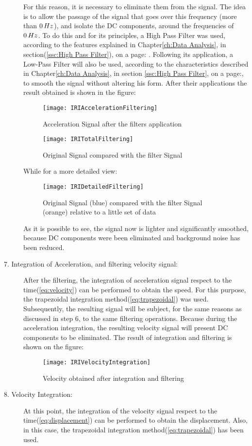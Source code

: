 \documentclass[tesi]{subfiles}
\begin{document}
\begin{description}
For this reason, it is necessary to eliminate them from the signal. The idea is to allow the passage of the signal that goes over this frequency (more than $0 \thinspace Hz$), and isolate the DC components, around the frequencies of $0 \thinspace Hz$. To do this and for its principles, a High Pass Filter was used, according to the features explained in Chapter\ref{ch:Data Analysis}, in section(\ref{ssc:High Pass Filter}), on a page: \pageref{ssc:High Pass Filter}.
Following its application, a Low-Pass Filter will also be used, according to the characteristics described in Chapter\ref{ch:Data Analysis}, in section \ref{ssc:High Pass Filter}, on a page:\pageref{ssc:Low Pass Filter}, to smooth the signal without altering his form.
After their applications the result obtained is shown in the figure:
\begin{figure}[H]
\centering
\texttt{[image: IRIAccelerationFiltering]}
\caption{Acceleration Signal after the filters application}
\end{figure}

\begin{figure}[H]
\centering
\texttt{[image: IRITotalFiltering]}
\caption{Original Signal compared with the filter Signal}
\end{figure}
\clearpage
While for a more detailed view:
\begin{figure}[H]
\centering
\texttt{[image: IRIDetailedFiltering]}
\caption{Original Signal (blue) compared with the filter Signal (orange) relative to a little set of data}
\end{figure}
As it is possible to see, the signal now is lighter and significantly smoothed, because DC components were been eliminated and background noise has been reduced.
\item[7. Integration of Acceleration, and filtering velocity signal:] After the filtering, the integration of acceleration signal respect to the time(\ref{eq:velocity}) can be performed to obtain the speed. For this purpose, the trapezoidal integration method(\ref{eq:trapezoidal}) was used. Subsequently, the resulting signal will be subject, for the same reasons as discussed in step 6, to the same filtering operations. Because during the acceleration integration, the resulting velocity signal will present DC components to be eliminated.
The result of integration and filtering is shown on the figure:
\begin{figure}[H]
\centering
\texttt{[image: IRIVelocityIntegration]}
\caption{Velocity obtained after integration and filtering}
\end{figure}
\clearpage
\item[8. Velocity Integration:]
At this point, the integration of the velocity signal respect to the time(\ref{eq:displacement}) can be performed to obtain the displacement. Also, in this case, the trapezoidal integration method(\ref{eq:trapezoidal}) has been used.


\end{description}
\end{document}
